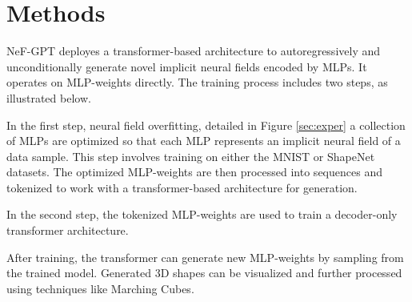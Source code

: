 \section{Methods}

NeF-GPT deployes a transformer-based architecture to autoregressively and unconditionally generate novel implicit neural fields encoded by MLPs. It operates on MLP-weights directly. The training process includes two steps, as illustrated below.

In the first step, neural field overfitting, detailed in Figure \ref{sec:exper} a collection of MLPs are optimized so that each MLP represents an implicit neural field of a data sample. This step involves training on either the MNIST or ShapeNet datasets. The optimized MLP-weights are then processed into sequences and tokenized to work with a transformer-based architecture for generation.

In the second step, the tokenized MLP-weights are used to train a decoder-only transformer architecture.

After training, the transformer can generate new MLP-weights by sampling from the trained model. Generated 3D shapes can be visualized and further processed using techniques like Marching Cubes.